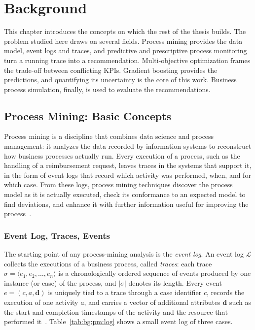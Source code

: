 \chapter{Background}
\label{chap:background}
This chapter introduces the concepts on which the rest of the thesis builds.
The problem studied here draws on several fields. Process mining provides the
data model, event logs and traces, and predictive and prescriptive process
monitoring turn a running trace into a recommendation. Multi-objective
optimization frames the trade-off between conflicting KPIs. Gradient boosting
provides the predictions, and quantifying its uncertainty is the core of this
work. Business process simulation, finally, is used to evaluate the
recommendations.

\section{Process Mining: Basic Concepts}
\label{sec:bg:pm}
Process mining is a discipline that combines data science and process
management: it analyzes the data recorded by information systems to
reconstruct how business processes actually run. Every execution of a
process, such as the handling of a reimbursement request, leaves traces in
the systems that support it, in the form of event logs that record which
activity was performed, when, and for which case. From these logs, process
mining techniques discover the process model as it is actually executed,
check its conformance to an expected model to find deviations, and enhance
it with further information useful for improving the
process~\cite{vanderaalst2016}.

    \subsection{Event Log, Traces, Events}
    \label{subsec:bg:pm:log}
    The starting point of any process-mining analysis is the \emph{event log}. An
    event log $\mathcal{L}$ collects the executions of a business process, called
    \emph{traces}: each trace $\sigma = \langle e_1, e_2, \dots, e_n \rangle$ is a
    chronologically ordered sequence of events produced by one instance (or case)
    of the process, and $|\sigma|$ denotes its length. Every event
    $e = (c, a, \mathbf{d})$ is uniquely tied to a trace through a case identifier
    $c$, records the execution of one activity $a$, and carries a vector of
    additional attributes $\mathbf{d}$ such as the start
    and completion timestamps of the activity and the resource that performed
    it~\cite{le2025balancing}. Table~\ref{tab:bg:pm:log} shows a small event
    log of three cases.

